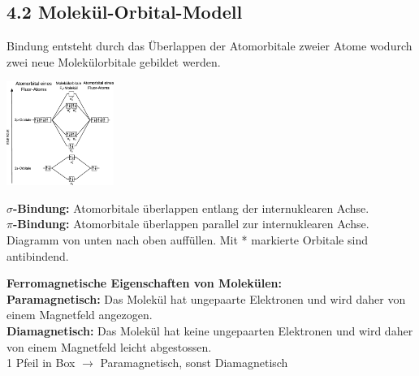 \begin{multicols*}{4}
\subsection{4.2 Molekül-Orbital-Modell}{
    Bindung entsteht durch das Überlappen der Atomorbitale zweier
    Atome wodurch zwei neue Molekülorbitale gebildet werden.\\
    \begin{minipage}{35mm}
        \includegraphics[width=3.5cm]{Bilder/Molekuelorbitalmodell.png}
    \end{minipage}
    \begin{minipage}{32mm}
        \textbf{$\sigma$-Bindung:} Atomorbitale überlappen entlang der internuklearen Achse.\\
        \textbf{$\pi$-Bindung:} Atomorbitale überlappen parallel zur internuklearen Achse.\\
        Diagramm von unten nach oben auffüllen. Mit * markierte Orbitale sind antibindend.
    \end{minipage}
    \textbf{Ferromagnetische Eigenschaften von Molekülen:}\\
    \textbf{Paramagnetisch: }Das Molekül hat ungepaarte Elektronen und wird daher
    von einem Magnetfeld angezogen.\\
    \textbf{Diamagnetisch: }Das Molekül hat keine ungepaarten Elektronen und wird
    daher von einem Magnetfeld leicht abgestossen.\\
    1 Pfeil in Box $\rightarrow$ Paramagnetisch, sonst Diamagnetisch
}


\end{multicols*}
